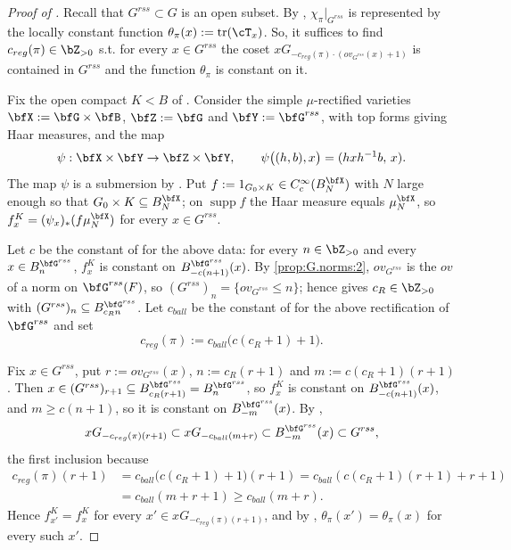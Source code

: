 \documentclass[12pt,a4paper]{amsart}%
\newcommand{\RamiB}[1]{{{#1}}}
\begin{document}
\begin{proof}[Proof of ]
\RamiB{Recall that $G^{rss} \subset G$ is an open subset.}    
    By , $\chi_\pi|_{G^{rss}}$ is represented by the locally constant function $\theta_\pi(x):=\operatorname{tr}(\cT_x)$. \RamiB{So, it suffices} to find $c_{reg}(\pi)\in\Z_{>0}$ s.t. for every $x\in G^{rss}$ the coset $xG_{-c_{reg}(\pi)\cdot(ov_{G^{rss}}(x)+1)}$ is contained in $G^{rss}$ and the function $\theta_\pi$ is constant on it.

    Fix the open compact $K<B$ of . Consider the simple $\mu$-rectified varieties $\bfX:=\bfG\times\bfB$, $\bfZ:=\bfG$ and $\bfY:=\bfG^{rss}$, with top forms giving Haar measures, and the map
    $$\psi:\bfX\times\bfY\to\bfZ\times\bfY,\qquad\psi\bigl((h,b),x\bigr)=(hxh^{-1}b,\,x).$$
    The map $\psi$ is a submersion by . Put $f:=1_{G_0\times K}\in C_c^\infty(B_N^{\bfX})$ with $N$ large enough so that $G_0\times K\subseteq B_N^{\bfX}$; on $\operatorname{supp}f$ the Haar measure equals $\mu_N^{\bfX}$, so $f^K_x=(\psi_x)_*(f\mu_N^{\bfX})$ for every $x\in G^{rss}$.

    Let $c$ be the constant of  for the above data: for every $n\in\Z_{>0}$ and every $x\in B^{\bfG^{rss}}_n$, $f_x^K$ is constant on $B^{\bfG^{rss}}_{-c(n+1)}(x)$. By \eqref{prop:G.norms:2}, $ov_{G^{rss}}$ is the $ov$ of a norm on $\bfG^{rss}(F)$, so $(G^{rss})_n=\{ov_{G^{rss}}\le n\}$; hence  gives $c_R\in\Z_{>0}$ with $(G^{rss})_n\subseteq B^{\bfG^{rss}}_{c_R n}$. Let $c_{ball}$ be the constant of  for the above rectification of $\bfG^{rss}$ and set $$c_{reg}(\pi):=c_{ball}\bigl(c(c_R+1)+1\bigr).$$

    Fix $x\in G^{rss}$, put $r:=ov_{G^{rss}}(x)$, $n:=c_R(r+1)$ and $m:=c(c_R+1)(r+1)$. Then $x\in(G^{rss})_{r+1}\subseteq B^{\bfG^{rss}}_{c_R(r+1)}= B^{\bfG^{rss}}_{n}$, so $f_x^K$ is constant on $B^{\bfG^{rss}}_{-c(n+1)}(x)$, and $m\geq c(n+1)$, so it is constant on $B^{\bfG^{rss}}_{-m}(x)$. By ,
    $$xG_{-c_{reg}(\pi)(r+1)}\subset xG_{-c_{ball}(m+r)}\subset B^{\bfG^{rss}}_{-m}(x)\subset G^{rss} ,$$
    the first inclusion because
    \begin{align*}
    c_{reg}(\pi)(r+1)&=c_{ball}\bigl(c(c_R+1)+1\bigr)(r+1)=
    c_{ball}(c(c_R+1)(r+1)+r+1)\\
    &=c_{ball}(m+r+1)\geq c_{ball}(m+r).
    \end{align*}
    Hence $f^K_{x'}=f^K_x$ for every $x'\in xG_{-c_{reg}(\pi)(r+1)}$, and by , $\theta_\pi(x')=\theta_\pi(x)$ for every such $x'$.
\end{proof}
\appendix
\end{document}
